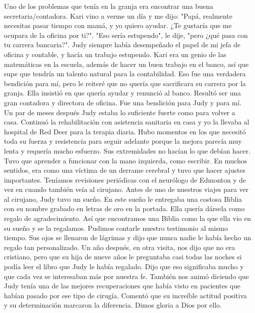 \documentclass[twoside, 12pt]{book}
\begin{document}
Uno de los problemas que tenía en la granja era encontrar una buena secretaria/contadora. Kari vino a verme un día y me dijo: "Papá, realmente necesitas pasar tiempo con mamá, y yo quiero ayudar. ¿Te gustaría que me ocupara de la oficina por ti?". "Eso sería estupendo", le dije, "pero ¿qué pasa con tu carrera bancaria?". Judy siempre había desempeñado el papel de mi jefa de oficina y contable, y hacía un trabajo estupendo. Kari era un genio de las matemáticas en la escuela, además de hacer un buen trabajo en el banco, así que supe que tendría un talento natural para la contabilidad. Eso fue una verdadera bendición para mí, pero le reiteré que no quería que sacrificara su carrera por la granja. Ella insistió en que quería ayudar y renunció al banco. Resultó ser una gran contadora y directora de oficina. Fue una bendición para Judy y para mí.
Un par de meses después Judy estaba lo suficiente fuerte como para volver a casa. Continuó la rehabilitación con asistencia sanitaria en casa y yo la llevaba al hospital de Red Deer para la terapia diaria. Hubo momentos en los que necesitó toda su fuerza y resistencia para seguir adelante porque la mejora parecía muy lenta y requería mucho esfuerzo. Sus extremidades no hacían lo que debían hacer. Tuvo que aprender a funcionar con la mano izquierda, como escribir. En muchos sentidos, era como una víctima de un derrame cerebral y tuvo que hacer ajustes importantes. Teníamos revisiones periódicas con el neurólogo de Edmonton y de vez en cuando también veía al cirujano. Antes de uno de nuestros viajes para ver al cirujano, Judy tuvo un sueño. En este sueño le entregaba una costosa Biblia con su nombre grabado en letras de oro en la portada. Ella quería dársela como regalo de agradecimiento. Así que encontramos una Biblia como la que ella vio en su sueño y se la regalamos. Pudimos contarle nuestro testimonio al mismo tiempo. Sus ojos se llenaron de lágrimas y dijo que nunca nadie le había hecho un regalo tan personalizado. Un año después, en otra visita, nos dijo que no era cristiano, pero que su hija de nueve años le preguntaba casi todas las noches si podía leer el libro que Judy le había regalado. Dijo que eso significaba mucho y que cada vez se interesaban más por nuestra fe. También nos animó diciendo que Judy tenía una de las mejores recuperaciones que había visto en pacientes que habían pasado por ese tipo de cirugía. Comentó que su increíble actitud positiva y su determinación marcaron la diferencia. Dimos gloria a Dios por ello.
\end{document}

